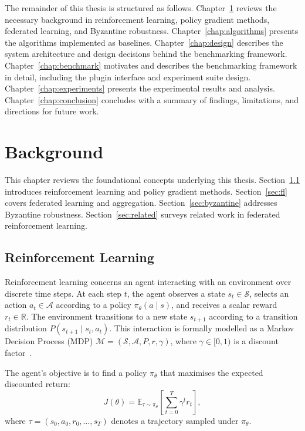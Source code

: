 \documentclass[a4paper, oneside]{discothesis}
\begin{document}
The remainder of this thesis is structured as follows. Chapter~\ref{chap:background} reviews the necessary background in reinforcement learning, policy gradient methods, federated learning, and Byzantine robustness. Chapter~\ref{chap:algorithms} presents the algorithms implemented as baselines. Chapter~\ref{chap:design} describes the system architecture and design decisions behind the benchmarking framework. Chapter~\ref{chap:benchmark} motivates and describes the benchmarking framework in detail, including the plugin interface and experiment suite design. Chapter~\ref{chap:experiments} presents the experimental results and analysis. Chapter~\ref{chap:conclusion} concludes with a summary of findings, limitations, and directions for future work.

\chapter{Background}
\label{chap:background}

This chapter reviews the foundational concepts underlying this thesis. Section~\ref{sec:rl} introduces reinforcement learning and policy gradient methods. Section~\ref{sec:fl} covers federated learning and aggregation. Section~\ref{sec:byzantine} addresses Byzantine robustness. Section~\ref{sec:related} surveys related work in federated reinforcement learning.

\section{Reinforcement Learning}
\label{sec:rl}

Reinforcement learning concerns an agent interacting with an environment over discrete time steps. At each step $t$, the agent observes a state $s_t \in \mathcal{S}$, selects an action $a_t \in \mathcal{A}$ according to a policy $\pi_\theta(a \mid s)$, and receives a scalar reward $r_t \in \mathbb{R}$. The environment transitions to a new state $s_{t+1}$ according to a transition distribution $P(s_{t+1} \mid s_t, a_t)$. This interaction is formally modelled as a Markov Decision Process (MDP) $\mathcal{M} = (\mathcal{S}, \mathcal{A}, P, r, \gamma)$, where $\gamma \in [0,1)$ is a discount factor~\cite{SuttonBarto}.

The agent's objective is to find a policy $\pi_\theta$ that maximises the expected discounted return:
\begin{equation}
    J(\theta) = \mathbb{E}_{\tau \sim \pi_\theta} \left[ \sum_{t=0}^{T} \gamma^t r_t \right],
\end{equation}
where $\tau = (s_0, a_0, r_0, \ldots, s_T)$ denotes a trajectory sampled under $\pi_\theta$.
\end{document}
